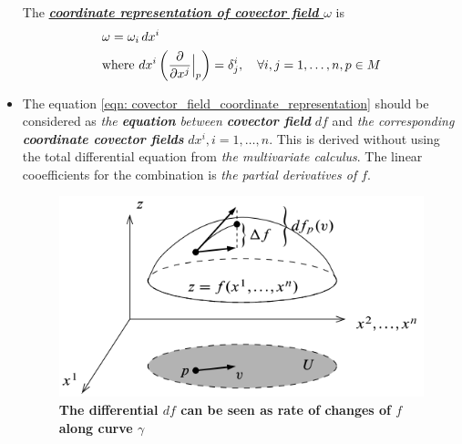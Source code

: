 \documentclass[11pt]{article}
\begin{document}
\begin{itemize}
\begin{remark}
The \underline{\emph{\textbf{coordinate representation of covector field $\omega$}}} is
\begin{align}
&\omega = \omega_i\, dx^i \label{eqn: covector_field_coordinate_representation} \\
&\text{where } dx^{i}\left(\frac{\partial }{ \partial x^{j}}\Bigr|_{p}\right) = \delta_{j}^{i}, \quad \forall i,j =1,\ldots, n, p \in M \nonumber
\end{align}

\end{remark}

\item \begin{remark} The equation \eqref{eqn: covector_field_coordinate_representation} should be considered as \emph{the \textbf{equation} between \textbf{covector field}} $df$ and \emph{the corresponding \textbf{coordinate covector fields}} $dx^{i}, i=1,\ldots, n$. This is derived without using the total differential equation from \emph{the multivariate calculus}. The linear cooefficients for the combination is \emph{the partial derivatives of $f$}.
\end{remark}

\begin{figure}[htb]
\centering
\begin{minipage}{0.5\linewidth}
 \centerline{\includegraphics[scale = 0.5]{differential_as_rate_of_change.png}}
\end{minipage}
\caption{\scriptsize
\textbf{The differential $df$ can be seen as rate of changes of $f$ along curve $\gamma$}}
\label{fig: differential_as_rate_of_change}
\end{figure}


\end{itemize}
\end{document}
